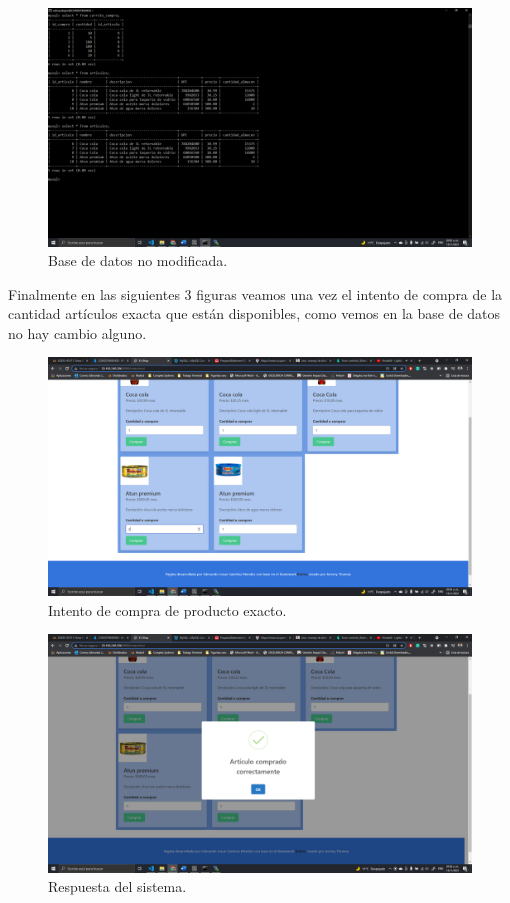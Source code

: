 \documentclass[11pt]{article}
\begin{document}
		\begin{figure}[H]
			\centering
			\includegraphics[scale=0.34]{resources/p3masbd.png}
			\caption{Base de datos no modificada.}\label{fig:picture}
		\end{figure}
		Finalmente en las siguientes 3 figuras veamos una vez el intento de compra de la cantidad artículos exacta que están disponibles, como vemos en la base de datos no hay cambio alguno.
		\begin{figure}[H]
			\centering
			\includegraphics[scale=0.34]{resources/p3mascond.png}
			\caption{Intento de compra de producto exacto.}\label{fig:picture}
		\end{figure}
		\begin{figure}[H]
			\centering
			\includegraphics[scale=0.34]{resources/p3mascon1.png}
			\caption{Respuesta del sistema.}\label{fig:picture}
		\end{figure}
\end{document}
